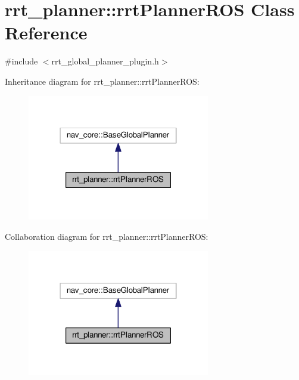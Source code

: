 \hypertarget{classrrt__planner_1_1rrtPlannerROS}{}\section{rrt\+\_\+planner\+:\+:rrt\+Planner\+R\+OS Class Reference}
\label{classrrt__planner_1_1rrtPlannerROS}


{\ttfamily \#include $<$rrt\+\_\+global\+\_\+planner\+\_\+plugin.\+h$>$}



Inheritance diagram for rrt\+\_\+planner\+:\+:rrt\+Planner\+R\+OS\+:
\nopagebreak
\begin{figure}[H]
\begin{center}
\leavevmode
\includegraphics[width=226pt]{classrrt__planner_1_1rrtPlannerROS__inherit__graph}
\end{center}
\end{figure}


Collaboration diagram for rrt\+\_\+planner\+:\+:rrt\+Planner\+R\+OS\+:
\nopagebreak
\begin{figure}[H]
\begin{center}
\leavevmode
\includegraphics[width=226pt]{classrrt__planner_1_1rrtPlannerROS__coll__graph}
\end{center}
\end{figure}
